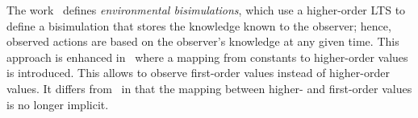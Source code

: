 %		



\noi 
The work~\cite{DBLP:conf/lics/SangiorgiKS07} defines \emph{environmental bisimulations},
which 
use a higher-order LTS 
to define a bisimulation that stores the knowledge known to
the observer; hence, observed actions are based on the observer's knowledge
at any given time. This approach is enhanced in~\cite{DBLP:journals/cl/KoutavasH12,DBLP:conf/esop/KoutavasH11}
where a mapping from constants to higher-order values is introduced. This 
allows to observe first-order values instead
of higher-order values. It differs from~\cite{San96H,JeffreyR05} in that 
the mapping between higher- and first-order values is no longer implicit.





